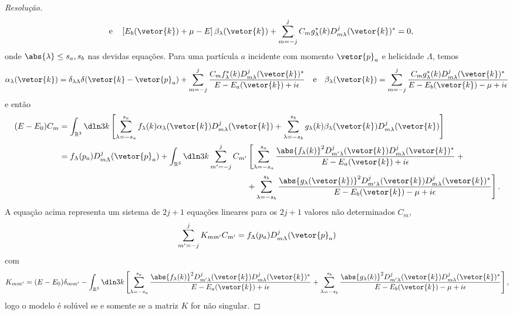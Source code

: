 \begin{proof}[Resolução]
\begin{equation*}
      \quad\text{e}\quad
      \left[E_b(\vetor{k}) + \mu - E\right]\beta_{\lambda}(\vetor{k}) + \sum_{m = -j}^j C_m g^*_\lambda(k) D^j_{m\lambda}(\vetor{k})^* = 0,
   \end{equation*}
   onde \(\abs{\lambda} \leq s_a, s_b\) nas devidas equações. Para uma partícula \(a\) incidente com momento \(\vetor{p}_a\) e helicidade \(\Lambda\), temos
   \begin{equation*}
      \alpha_{\lambda}(\vetor{k}) = \delta_{\lambda \Lambda} \delta(\vetor{k} - \vetor{p}_a) + \sum_{m = - j}^{j} \frac{C_m f_\lambda^*(k) D_{m\lambda}^j(\vetor{k})^*}{E - E_a(\vetor{k}) + i\epsilon}
      \quad\text{e}\quad
      \beta_{\lambda}(\vetor{k}) = \sum_{m = - j}^{j} \frac{C_m g_\lambda^*(k) D_{m\lambda}^j(\vetor{k})^*}{E - E_b(\vetor{k}) - \mu + i\epsilon}
   \end{equation*}
   e então
   \begin{align*}
      (E - E_0)C_{m} &= \int_{\mathbb{R}^3} \dln3{k} \left[\sum_{\lambda = -s_a}^{s_a} f_\lambda(k) \alpha_{\lambda}(\vetor{k}) D^{j}_{m\lambda}(\vetor{k}) + \sum_{\lambda = -s_b}^{s_b} g_{\lambda}(k) \beta_\lambda(\vetor{k}) D^j_{m \lambda}(\vetor{k})\right]\\
                     &= f_{\Lambda}(p_a) D^j_{m \Lambda}(\vetor{p}_a) + \int_{\mathbb{R}^3} \dln3k \sum_{m' = -j}^{j}C_{m'}\left[\sum_{\lambda = -s_a}^{s_a} \frac{\abs{f_\lambda(k)}^2 D^j_{m' \lambda}(\vetor{k}) D^{j}_{m \lambda}(\vetor{k})^*}{E - E_a(\vetor{k}) + i \epsilon}  +{} \right.\\
                     &{}\phantom{f_{\Lambda}(p_a) D^j_{m \Lambda}(\vetor{p}_a) + \int_{\mathbb{R}^3} \dln3k \sum_{m' = -j}^{j}C_{m'} + {}}\left.+ \sum_{\lambda = -s_b}^{s_b}\frac{\abs{g_\lambda(\vetor{k})}^2D^j_{m' \lambda}(\vetor{k}) D^{j}_{m \lambda}(\vetor{k})^*}{E - E_b(\vetor{k}) - \mu + i\epsilon}\right].
   \end{align*}
   A equação acima representa um sistema de \(2j + 1\) equações lineares para os \(2j + 1\) valores não determinados \(C_{m},\) 
   \begin{equation*}
      \sum_{m' = -j}^{j} K_{mm'} C_{m'} = f_\Lambda(p_a) D^j_{m \Lambda}(\vetor{p}_a)
   \end{equation*}
   com 
   \begin{equation*}
      K_{mm'} = (E - E_0) \delta_{mm'} - \int_{\mathbb{R}^3}\dln3k \left[\sum_{\lambda = -s_a}^{s_a} \frac{\abs{f_\lambda(k)}^2 D^{j}_{m'\lambda}(\vetor{k}) D^j_{m \lambda}(\vetor{k})^*}{E - E_a(\vetor{k}) + i \epsilon} + \sum_{\lambda = -s_b}^{s_b} \frac{\abs{g_\lambda(k)}^2 D^{j}_{m'\lambda}(\vetor{k}) D^j_{m \lambda}(\vetor{k})^*}{E - E_b(\vetor{k}) - \mu + i \epsilon}\right],
   \end{equation*}
   logo o modelo é solúvel se e somente se a matriz \(K\) for não singular.


\end{proof}
